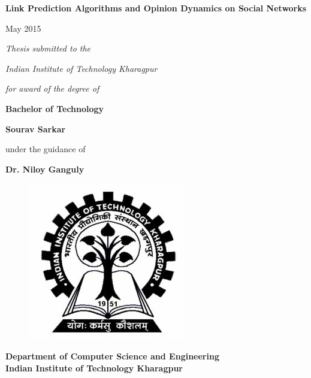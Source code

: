 \begin{titlepage}
{\centering \huge { \textbf{
     Link Prediction Algorithms and Opinion Dynamics on Social Networks}} \par 
}

\thispagestyle{empty}
\vspace{1cm}
\begin{center}
{
   
   May 2015
}
\end{center}
\vspace{1cm}
{\centering \large {\textit{ 
     Thesis submitted to the } }  \par 
}
 
\vspace{0.5cm}
{\centering \large {\textit{ 
     Indian Institute of Technology 
     Kharagpur } }  \par 
}
 
\vspace{0.5cm}
{\centering \large {\textit{ 
      for award of the degree of} }  \par 
}
 
{\centering \Large { \textbf { 
  Bachelor of Technology}} \par
}

\vspace{0.875cm}
{\par}
\vspace{0.875cm}
{\centering \large \textbf{Sourav Sarkar}\par}
\vspace{0.75cm}
{\centering \large under the guidance of\par}
\vspace{0.75cm}
{\centering \large \textbf{Dr. Niloy Ganguly}\par}
\vspace{1cm}
\begin{figure}[h]
    \centering
    \includegraphics[scale=0.2]{cover_page/images/logo.jpg}
\end{figure}
\begin{center}
{
   \large \textbf{Department of Computer Science and Engineering} \\
   \large \textbf{Indian Institute of Technology Kharagpur}
   
}
\end{center}
\end{titlepage}